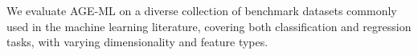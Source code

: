 \documentclass[runningheads]{llncs}
\newcommand{\ourapproach}[0]{\textsc{AGE-ML}}
\begin{document}
We evaluate \ourapproach{} on a diverse collection of benchmark datasets commonly used in the machine learning literature,
covering both classification and regression tasks,
with varying dimensionality and feature types.
%
%
%
%
%
%
\end{document}
